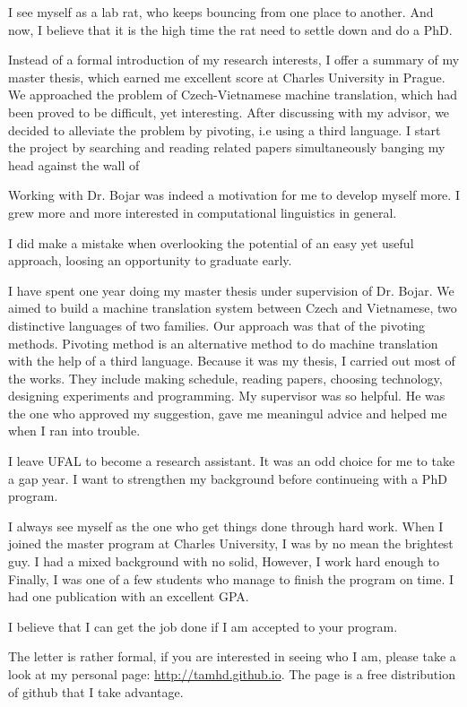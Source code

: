 \documentclass[a4paper, 12pt]{scrartcl}
\begin{document}
I see myself as a lab rat, who keeps bouncing from one place to another. And now, I believe that it is the high time the rat need to settle down and do a PhD.



Instead of a formal introduction of my research interests, I offer a summary of my master thesis, which earned me excellent score at Charles University in Prague. 
We approached the problem of Czech-Vietnamese machine translation, which had been proved to be difficult, yet interesting.
After discussing with my advisor, we decided to alleviate the problem by pivoting, i.e using a third language. 
I start the project by searching and reading related papers simultaneously banging my head against the wall of 

Working with Dr. Bojar was indeed a motivation for me to develop myself more. I grew more and more interested in computational linguistics in general. 



I did make a mistake when overlooking the potential of an easy yet useful approach, loosing an opportunity to graduate early. 


I have spent one year doing my master thesis under supervision of Dr. Bojar. 
We aimed to build a machine translation system between Czech and Vietnamese, two distinctive languages of two families. 
Our approach was that of the pivoting methods.
Pivoting method is an alternative method to do machine translation with the help of a third language. 
Because it was my thesis, I carried out most of the works. They include making schedule, reading papers, choosing technology, designing experiments and programming.
My supervisor was so helpful. 
He was the one who approved my suggestion, gave me meaningul advice and helped me when I ran into trouble. 




I leave UFAL to become a research assistant. 
It was an odd choice for me to take a gap year.
I want to strengthen my background before continueing with a PhD program. 






I always see myself as the one who get things done through hard work. 
When I joined the master program at Charles University, I was by no mean the brightest guy. 
I had a mixed background with no solid, 
However, I work hard enough to 
Finally, I was one of a few students who manage to finish the program on time. 
I had one publication with an excellent GPA. 

I believe that I can get the job done if I am accepted to your program.

The letter is rather formal, if you are interested in seeing who I am, please take a look at my personal page: \url{http://tamhd.github.io}. The page is a free distribution of github that I take advantage. 
\end{document}

